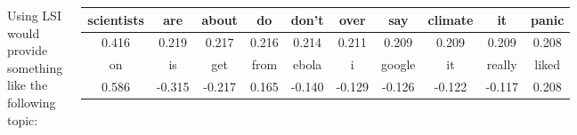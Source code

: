 \documentclass[17pt, a1paper, portrait, margin=0mm, innermargin=10mm,
     blockverticalspace=15mm, colspace=10mm, subcolspace=8mm]{tikzposter} %
\begin{document}
\begin{columns}
{     Using LSI would provide something like the following topic:
     \begin{tikzfigure}
       \label{tab:topics}
       \begin{tabular}{|c|c|c|c|c|c|c|c|c|c|}
         \hline
         scientists & are   & about & do    & don't & over  & say   & climate & it    & panic \\ 
         \hline
         0.416      & 0.219 & 0.217 & 0.216 & 0.214 & 0.211 & 0.209 & 0.209   & 0.209 & 0.208 \\ 
         \hline
         \hline
         on    & is     & get    & from  & ebola  & i      & google & it     & really & liked \\ 
         \hline
         0.586 & -0.315 & -0.217 & 0.165 & -0.140 & -0.129 & -0.126 & -0.122 & -0.117 & 0.208 \\ 
         \hline
       \end{tabular}
     \end{tikzfigure}
   } 
\end{columns}
\end{document}
